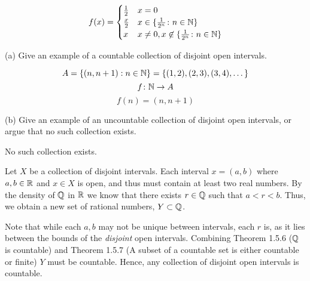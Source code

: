 \documentclass{report}
\begin{document}
$$ f(x) = 
  \begin{cases} 
    \frac{1}{2} & x= 0 \\
    \frac{x}{2} &  x \in \{ \frac{1}{2^n} \colon n \in \NN \} \\
    x & x \neq 0, x \not\in \{ \frac{1}{2^n} \colon n \in \NN \}
   \end{cases}
$$
\sol


 (a) Give an example of a countable collection of disjoint open intervals.
\par \bigskip

$$A=\{(n, n+1): n \in \NN\} = \{(1,2),(2,3),(3,4),\dots\}$$
$$
f \colon \NN \rightarrow A 
$$ $$ f(n)= (n, n+1)$$
\par \bigskip

 (b) Give an example of an uncountable collection of disjoint open intervals, or argue that no such collection exists.


No such collection exists.

\begin{myproof}
    
Let $X$ be a collection of disjoint intervals. Each interval $x =(a,b)$ where $a,b \in \RR$ and $x\in X$ is open, and thus must contain at least two real numbers. By the density of $\QQ$ in $\RR$ we know that there exists $r \in \QQ$ such that $a < r < b.$ Thus, we obtain a new set of rational numbers, $Y \subset \QQ$.

Note that while each $a, b$ may not be unique between intervals, each $r$ is, as it lies between the bounds of the \textit{disjoint} open intervals. Combining Theorem 1.5.6 ($\QQ$ is countable) and Theorem 1.5.7 (A subset of a countable set is either countable or finite) $Y$ must be countable. Hence, any collection of disjoint open intervals is countable.

\end{myproof}

\end{document}
